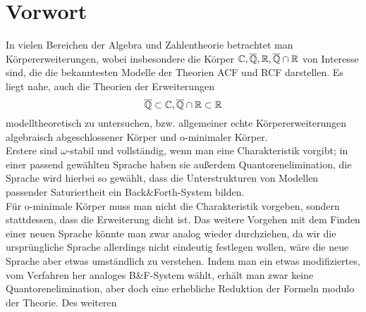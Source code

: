 \chapter*{Vorwort}
In vielen Bereichen der Algebra und Zahlentheorie betrachtet man Körpererweiterungen, wobei insbesondere die Körper $\mathbb{C},\overline{\mathbb{Q}},\mathbb{R},\overline{\mathbb{Q}}\cap\mathbb{R}$ von Interesse sind, die die bekanntesten Modelle der Theorien ACF und RCF darstellen. Es liegt nahe, auch die Theorien der Erweiterungen $$\overline{\mathbb{Q}}\subset\mathbb{C},\overline{\mathbb{Q}}\cap\mathbb{R}\subset\mathbb{R}$$ modelltheoretisch zu untersuchen, bzw. allgemeiner echte Körpererweiterungen algebraisch abgeschlossener Körper und o-minimaler Körper.\\
Erstere sind $\omega$-stabil und vollständig, wenn man eine Charakteristik vorgibt; in einer passend gewählten Sprache haben sie außerdem Quantorenelimination, die Sprache wird hierbei so gewählt, dass die Unterstrukturen von Modellen passender Saturiertheit ein Back\&Forth-System bilden.\\
Für o-minimale Körper muss man nicht die Charakteristik vorgeben, sondern stattdessen, dass die Erweiterung dicht ist. Das weitere Vorgehen mit dem Finden einer neuen Sprache könnte man zwar analog wieder durchziehen, da wir die ursprüngliche Sprache allerdings nicht eindeutig festlegen wollen, wäre die neue Sprache aber etwas umständlich zu verstehen. Indem man ein etwas modifiziertes, vom Verfahren her analoges B\&F-System wählt, erhält man zwar keine Quantorenelimination, aber doch eine erhebliche Reduktion der Formeln modulo der Theorie. Des weiteren 